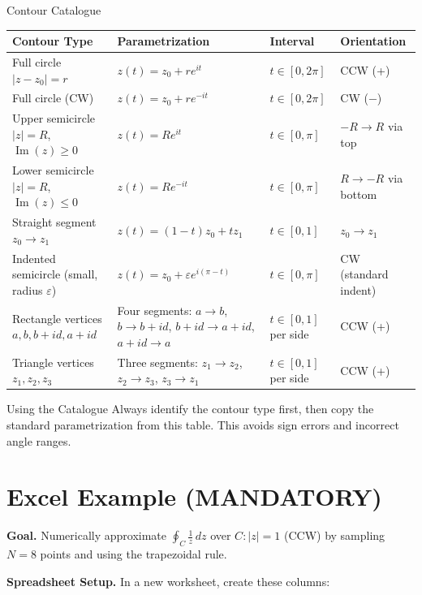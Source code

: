 \documentclass[12pt,a4paper]{article}
\begin{document}
\begin{infobox}{Contour Catalogue}
\renewcommand{\arraystretch}{1.35}
\begin{tabular}{@{}p{3.2cm}p{4.8cm}p{2.8cm}p{2.5cm}@{}}
\toprule
\textbf{Contour Type} & \textbf{Parametrization} & \textbf{Interval} & \textbf{Orientation} \\
\midrule
Full circle $|z-z_0|=r$ & $z(t)=z_0+re^{it}$ & $t\in[0,2\pi]$ & CCW (+) \\
Full circle (CW) & $z(t)=z_0+re^{-it}$ & $t\in[0,2\pi]$ & CW ($-$) \\
Upper semicircle $|z|=R$, $\operatorname{Im}(z)\ge0$ & $z(t)=Re^{it}$ & $t\in[0,\pi]$ & $-R \to R$ via top \\
Lower semicircle $|z|=R$, $\operatorname{Im}(z)\le0$ & $z(t)=Re^{-it}$ & $t\in[0,\pi]$ & $R \to -R$ via bottom \\
Straight segment $z_0\to z_1$ & $z(t)=(1-t)z_0+tz_1$ & $t\in[0,1]$ & $z_0 \to z_1$ \\
Indented semicircle (small, radius $\varepsilon$) & $z(t)=z_0+\varepsilon e^{i(\pi-t)}$ & $t\in[0,\pi]$ & CW (standard indent) \\
Rectangle vertices $a,b,b+id,a+id$ & Four segments: $a\to b$, $b\to b+id$, $b+id\to a+id$, $a+id\to a$ & $t\in[0,1]$ per side & CCW (+) \\
Triangle vertices $z_1,z_2,z_3$ & Three segments: $z_1\to z_2$, $z_2\to z_3$, $z_3\to z_1$ & $t\in[0,1]$ per side & CCW (+) \\
\bottomrule
\end{tabular}
\end{infobox}

\begin{learnbox}{Using the Catalogue}
Always identify the contour type first, then copy the standard parametrization
from this table. This avoids sign errors and incorrect angle ranges.
\end{learnbox}

\section{Excel Example (MANDATORY)}

\textbf{Goal.} Numerically approximate $\displaystyle\oint_C \frac{1}{z}\,dz$
over $C: |z|=1$ (CCW) by sampling $N=8$ points and using the trapezoidal rule.

\medskip
\textbf{Spreadsheet Setup.} In a new worksheet, create these columns:
\end{document}
